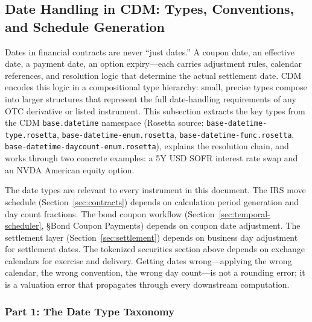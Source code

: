 \documentclass[11pt,a4paper]{article}
\begin{document}

\clearpage
\subsection{Date Handling in CDM: Types, Conventions, and Schedule Generation}
\label{sec:cdm-dates}

Dates in financial contracts are never ``just dates.'' A coupon date, an effective date, a payment date, an option expiry---each carries adjustment rules, calendar references, and resolution logic that determine the actual settlement date. CDM encodes this logic in a compositional type hierarchy: small, precise types compose into larger structures that represent the full date-handling requirements of any OTC derivative or listed instrument. This subsection extracts the key types from the CDM \texttt{base.datetime} namespace (Rosetta source: \texttt{base-datetime-type.rosetta}, \texttt{base-datetime-enum.rosetta}, \texttt{base-datetime-func.rosetta}, \texttt{base-datetime-daycount-enum.rosetta}), explains the resolution chain, and works through two concrete examples: a 5Y USD SOFR interest rate swap and an NVDA American equity option.

The date types are relevant to every instrument in this document. The IRS move schedule (Section~\ref{sec:contracts}) depends on calculation period generation and day count fractions. The bond coupon workflow (Section~\ref{sec:temporal-scheduler}, \S Bond Coupon Payments) depends on coupon date adjustment. The settlement layer (Section~\ref{sec:settlement}) depends on business day adjustment for settlement dates. The tokenized securities section above depends on exchange calendars for exercise and delivery. Getting dates wrong---applying the wrong calendar, the wrong convention, the wrong day count---is not a rounding error; it is a valuation error that propagates through every downstream computation.

\subsubsection{Part 1: The Date Type Taxonomy}
\label{sec:cdm-date-types}
\end{document}
